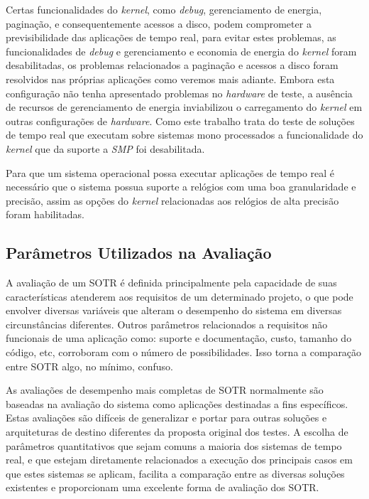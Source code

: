 Certas funcionalidades do \textit{kernel}, como \textit{debug}, gerenciamento de energia, paginação, e consequentemente acessos a disco, podem comprometer a previsibilidade das aplicações de tempo real, para evitar estes problemas, as funcionalidades de \textit{debug} e gerenciamento e economia de energia do \textit{kernel} foram desabilitadas, os problemas relacionados a paginação e acessos a disco foram resolvidos nas próprias aplicações como veremos mais adiante. Embora esta configuração não tenha apresentado problemas no \textit{hardware} de teste, a ausência de recursos de gerenciamento de energia inviabilizou o carregamento do \textit{kernel} em outras configurações de \textit{hardware}. Como este trabalho trata do teste de soluções de tempo real que executam sobre sistemas mono processados a funcionalidade do \textit{kernel} que da suporte a \textit{SMP} foi desabilitada.
		
Para que um sistema operacional possa executar aplicações de tempo real é necessário que o sistema possua suporte a relógios com uma boa granularidade e precisão, assim as opções do \textit{kernel} relacionadas aos relógios de alta precisão foram habilitadas.
	
\subsection{Parâmetros Utilizados na Avaliação}

A avaliação de um SOTR é definida principalmente pela capacidade de suas características atenderem aos requisitos de um determinado projeto, o que pode envolver diversas variáveis que alteram o desempenho do sistema em diversas circunstâncias diferentes. Outros parâmetros relacionados a requisitos não funcionais de uma aplicação como: suporte e documentação, custo, tamanho do código, etc, corroboram com o número de possibilidades. Isso torna a comparação entre SOTR algo, no mínimo, confuso.

As avaliações de desempenho mais completas de SOTR normalmente são baseadas na avaliação do sistema como aplicações destinadas a fins específicos. Estas avaliações são difíceis de generalizar e portar para outras soluções e arquiteturas de destino diferentes da proposta original dos testes. A escolha de parâmetros quantitativos que sejam comuns a maioria dos sistemas de tempo real, e que estejam diretamente relacionados a execução dos principais casos em que estes sistemas se aplicam, facilita a comparação entre as diversas soluções existentes e proporcionam uma excelente forma de avaliação dos SOTR.

